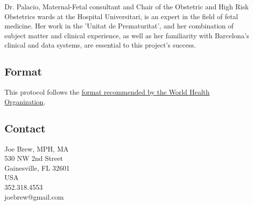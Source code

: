 \documentclass{article}
\begin{document}
\begin{multicols}{2}
Dr. Palacio, Maternal-Fetal consultant and Chair of the Obstetric and High Risk Obstetrics wards at the Hospital Universitari, is an expert in the field of fetal medicine.  Her work in the 'Unitat de Prematuritat', and her combination of subject matter and clinical experience, as well as her familiarity with Barcelona's clinical and data systems, are essential to this project's success.  


\subsection*{Format}
This protocol follows the \href{http://www.who.int/rpc/research_ethics/format_rp/en/}{format recommended by the World Health Organization}. \\

\vfill
\columnbreak

\subsection*{Contact}
Joe Brew, MPH, MA\\
530 NW 2nd Street \\
Gainesville, FL 32601 \\
USA \\
352.318.4553 \\
joebrew@gmail.com


\end{multicols}
\newpage


\end{document}

